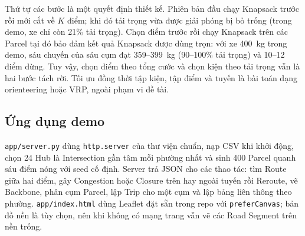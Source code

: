 Thứ tự các bước là một quyết định thiết kế. Phiên bản đầu chạy Knapsack trước rồi mới cắt về $K$ điểm; khi đó tải trọng vừa được giải phóng bị bỏ trống (trong demo, xe chỉ còn 21\% tải trọng). Chọn điểm trước rồi chạy Knapsack trên các Parcel tại đó bảo đảm kết quả Knapsack được dùng trọn: với xe 400~kg trong demo, sáu chuyến của sáu cụm đạt 359--399~kg (90--100\% tải trọng) và 10--12 điểm dừng. Tuy vậy, chọn điểm theo tổng cước và chọn kiện theo tải trọng vẫn là hai bước tách rời. Tối ưu đồng thời tập kiện, tập điểm và tuyến là bài toán dạng orienteering hoặc VRP, ngoài phạm vi đề tài.

\subsection{Ứng dụng demo}

\texttt{app/server.py} dùng \texttt{http.server} của thư viện chuẩn, nạp CSV khi khởi động, chọn 24 Hub là Intersection gần tâm mỗi phường nhất và sinh 400 Parcel quanh sáu điểm nóng với seed cố định. Server trả JSON cho các thao tác: tìm Route giữa hai điểm, gây Congestion hoặc Closure trên hay ngoài tuyến rồi Reroute, vẽ Backbone, phân cụm Parcel, lập Trip cho một cụm và lập bảng liên thông theo phường. \texttt{app/index.html} dùng Leaflet đặt sẵn trong repo với \texttt{preferCanvas}; bản đồ nền là tùy chọn, nên khi không có mạng trang vẫn vẽ các Road Segment trên nền trống.
